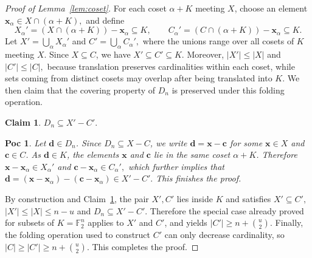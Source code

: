 \documentclass[10pt,a4paper]{amsart}
\newtheorem{claim}{Claim}
\newtheorem{poc}{Poc}
\begin{document}
\begin{proof}[Proof of Lemma~\ref{lem:coset}]
For each coset \(\alpha+K\) meeting \(X\), choose an element
\(
    \boldsymbol{x}_\alpha\in X\cap(\alpha+K),
\)
and define
\[
    X_\alpha'
    =
    (X\cap(\alpha+K))-\boldsymbol{x}_\alpha
    \subseteq K,
    \qquad
    C_\alpha'
    =
    (C\cap(\alpha+K))-\boldsymbol{x}_\alpha
    \subseteq K.
\]
Let
\(
    X'=\bigcup_\alpha X_\alpha'\) and
    \(
    C'=\bigcup_\alpha C_\alpha',
\)
where the unions range over all cosets of \(K\) meeting \(X\).  Since \(X\subseteq C\), we have
\(
    X'\subseteq C'\subseteq K.
\)
Moreover,
\(
    |X'|\le |X|\) and
    \(
    |C'|\le |C|,
\)
because translation preserves cardinalities within each coset, while sets coming from distinct cosets may overlap after being translated into \(K\). We then claim that the covering property of \(D_n\) is preserved under this folding operation.
\begin{claim}\label{claim:DXC}
    \(D_n\subseteq X'-C'.\)
\end{claim}
\begin{poc}
    Let \(\boldsymbol{d}\in D_n\).  Since \(D_n\subseteq X-C\), we write
    \(
        \boldsymbol{d}=\boldsymbol{x}-\boldsymbol{c}
    \)
    for some \(\boldsymbol{x}\in X\) and \(\boldsymbol{c}\in C\).  As \(\boldsymbol{d}\in K\), the elements \(\boldsymbol{x}\) and \(\boldsymbol{c}\) lie in the same coset \(\alpha+K\).  Therefore
    \(
        \boldsymbol{x}-\boldsymbol{x}_\alpha\in X_\alpha'\) and
        \(
        \boldsymbol{c}-\boldsymbol{x}_\alpha\in C_\alpha',
    \)
    which further implies that
    \(
        \boldsymbol{d}
        =
        (\boldsymbol{x}-\boldsymbol{x}_\alpha)
        -
        (\boldsymbol{c}-\boldsymbol{x}_\alpha)
        \in X'-C'.
    \) This finishes the proof.
\end{poc}
By construction and Claim~\ref{claim:DXC}, the pair \(X',C'\) lies inside \(K\) and satisfies
\(
    X'\subseteq C',\) \(
    |X'|\le |X|\le n-u\) and
    \(D_n\subseteq X'-C'.
\)
Therefore the special case already proved for subsets of \(K=\mathbb{F}_2^n\) applies to \(X'\) and \(C'\), and yields
\(
    |C'|\ge n+\binom{u}{2}.
\)
Finally, the folding operation used to construct \(C'\) can only decrease cardinality, so 
\(
    |C|\ge |C'|\ge n+\binom{u}{2}.
\)
This completes the proof.
\end{proof}
\end{document}
